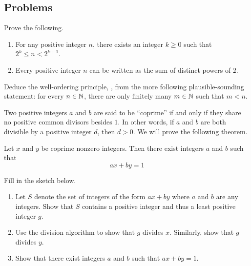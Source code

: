 \documentclass[../main.tex]{subfiles}
\begin{document}
\subsection{Problems}
\begin{homework}
    Prove the following.
    \begin{enumerate}[label=(\alph*)]
        \item For any positive integer $n$, there exists an integer $k\ge0$ such that $2^k\le n<2^{k+1}$.
        \item Every positive integer $n$ can be written as the sum of distinct powers of $2$.
    \end{enumerate}
\end{homework}

\begin{homework}
    Deduce the well-ordering principle, , from the more following plausible-sounding statement: for every $n \in \mathbb N$, there are only finitely many $m \in \mathbb N$ such that $m < n$.
\end{homework}

\begin{homework}
    Two positive integers $a$ and $b$ are said to be ``coprime'' if and only if they share no positive common divisors besides $1$. In other words, if $a$ and $b$ are both divisible by a positive integer $d$, then $d>0$. We will prove the following theorem.
    \begin{theorem}[Bezout]
        Let $x$ and $y$ be coprime nonzero integers. Then there exist integers $a$ and $b$ such that
        \begin{equation*}
            ax + by = 1
        \end{equation*}
    \end{theorem}
    Fill in the sketch below.
    \begin{enumerate}[label=(\alph*)]
        \item Let $S$ denote the set of integers of the form $ax+by$ where $a$ and $b$ are any integers. Show that $S$ contains a positive integer and thus a least positive integer $g$.
        \item Use the division algorithm to show that $g$ divides $x$. Similarly, show that $g$ divides $y$.
        \item Show that there exist integers $a$ and $b$ such that $ax+by=1$.
    \end{enumerate}
\end{homework}
\end{document}
